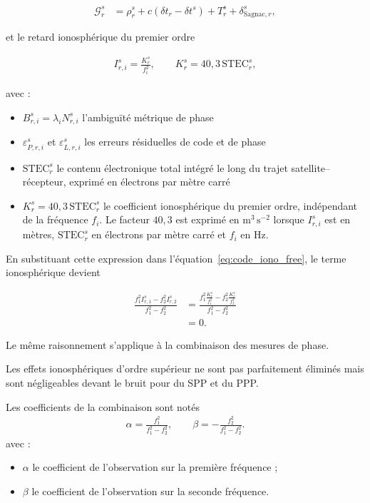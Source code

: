 \begin{align}
\mathcal G_r^s
&=
\rho_r^s
+c\left(\delta t_r-\delta t^s\right)
+T_r^s
+\delta_{\mathrm{Sagnac},r}^s
,
\label{eq:common_nondispersive_term}
\end{align}

et le retard ionosphérique du premier ordre

\begin{align}
I_{r,i}^s
=
\frac{K_r^s}{f_i^2},
\qquad
K_r^s=40{,}3\,\mathrm{STEC}_r^s,
\end{align}

avec :

\begin{itemize}
    \item $B_{r,i}^s=\lambda_iN_{r,i}^s$ l'ambiguïté métrique de phase 
    \item $\varepsilon_{P,r,i}^s$ et $\varepsilon_{L,r,i}^s$ les erreurs
    résiduelles de code et de phase 
    \item $\mathrm{STEC}_r^s$ le contenu électronique total intégré le long
    du trajet satellite--récepteur, exprimé en électrons par mètre carré 
    \item $K_r^s=40{,}3\,\mathrm{STEC}_r^s$ le coefficient ionosphérique du
    premier ordre, indépendant de la fréquence $f_i$. Le facteur $40{,}3$
    est exprimé en $\mathrm{m^3\,s^{-2}}$ lorsque $I_{r,i}^s$ est en mètres,
    $\mathrm{STEC}_r^s$ en électrons par mètre carré et $f_i$ en Hz.
\end{itemize}

En substituant cette expression dans l'équation~\eqref{eq:code_iono_free},
le terme ionosphérique devient

\begin{align}
\frac{
f_1^2I_{r,1}^s-f_2^2I_{r,2}^s
}{
f_1^2-f_2^2
}
&=
\frac{
f_1^2\frac{K_r^s}{f_1^2}
-
f_2^2\frac{K_r^s}{f_2^2}
}{
f_1^2-f_2^2
}
\\
&=
0.
\end{align}

Le même raisonnement s'applique à la combinaison des mesures de phase.

Les effets ionosphériques d'ordre
supérieur ne sont pas parfaitement éliminés mais sont négligeables devant le bruit pour du SPP et du PPP.



Les coefficients de la combinaison sont notés
\begin{align}
\alpha=\frac{f_1^2}{f_1^2-f_2^2},\qquad
\beta=-\frac{f_2^2}{f_1^2-f_2^2}.
\label{new:if}
\end{align}
avec :
\begin{itemize}
\item $\alpha$ le coefficient de l'observation sur la première fréquence ;
\item $\beta$ le coefficient de l'observation sur la seconde fréquence.
\end{itemize}

